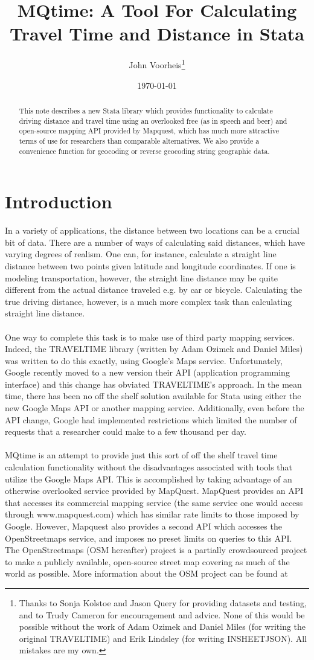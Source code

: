 \documentclass[12pt]{article}
\title{MQtime: A Tool For Calculating Travel Time and Distance in Stata}
\author{John Voorheis\thanks{Thanks to Sonja Kolstoe and Jason Query for providing datasets and testing, and to Trudy Cameron for encouragement and advice. None of this would be possible without the work of Adam Ozimek and Daniel Miles (for writing the original TRAVELTIME) and Erik Lindsley (for writing INSHEETJSON). All mistakes are my own.}}
\affil{University of Oregon}
\date{\today}
\begin{document}
\maketitle

\begin{abstract}
This note describes a new Stata library which provides functionality to calculate driving distance and travel time using an overlooked free (as in speech and beer)  and open-source mapping API provided by Mapquest, which has much more attractive terms of use for researchers than comparable alternatives. We also provide a convenience function for geocoding or reverse geocoding string geographic data. 
\end{abstract}

\section{Introduction}
In a variety of applications, the distance between two locations can be a crucial bit of data. There are a number of ways of calculating said distances, which have varying degrees of realism. One can, for instance, calculate a straight line distance between two points given latitude and longitude coordinates. If one is modeling transportation, however, the straight line distance may be quite different from the actual distance traveled e.g. by car or bicycle. Calculating the true driving distance, however, is a much more complex task than calculating straight line distance. 
\\ \\
One way to complete this task is to make use of third party mapping services. Indeed, the TRAVELTIME library (written by Adam Ozimek and Daniel Miles) was written to do this exactly, using Google's Maps service. Unfortunately, Google recently moved to a new version their API (application programming interface) and this change has obviated TRAVELTIME's approach. In the mean time, there has been no off the shelf solution available for Stata using either the new Google Maps API or another mapping service. Additionally, even before the API change, Google had implemented restrictions which limited the number of requests that a researcher could make to a few thousand per day.
\\ \\
MQtime is an attempt to provide just this sort of off the shelf travel time calculation functionality without the disadvantages associated with tools that utilize the Google Maps API. This is accomplished by taking advantage of an otherwise overlooked service provided by MapQuest. MapQuest provides an API that accesses its commercial mapping service (the same service one would access through www.mapquest.com) which has similar rate limits to those imposed by Google. However, Mapquest also provides a second API which accesses the OpenStreetmaps service, and imposes no preset limits on queries to this API. The OpenStreetmaps (OSM hereafter) project is a partially crowdsourced project to make a publicly available, open-source street map covering as much of the world as possible. More information about the OSM project can be found at 
\end{document}
